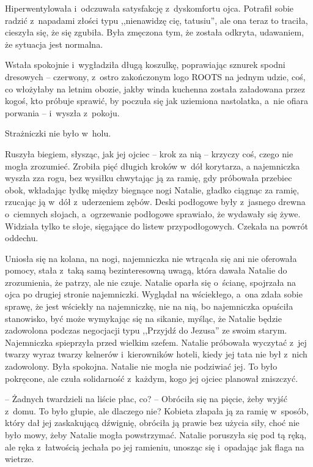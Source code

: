 \documentclass[oneside,polish,11pt,sfheadings]{mwbk}
\begin{document}
Hiperwentylowała i~odczuwała satysfakcję z~dyskomfortu ojca. Potrafił
sobie radzić z~napadami złości typu ,,nienawidzę cię, tatusiu'', ale ona
teraz to traciła, cieszyła się, że się zgubiła. Była zmęczona tym, że
została odkryta, udawaniem, że sytuacja jest normalna.

Wstała spokojnie i~wygładziła długą koszulkę, poprawiając sznurek spodni
dresowych -- czerwony, z~ostro zakończonym logo ROOTS na jednym udzie,
coś, co włożyłaby na letnim obozie, jakby winda kuchenna została
załadowana przez kogoś, kto próbuje sprawić, by poczuła się jak
uziemiona nastolatka, a~nie ofiara porwania -- i~wyszła z~pokoju.

Strażniczki nie było w~holu.

Ruszyła biegiem, słysząc, jak jej ojciec -- krok za nią -- krzyczy coś,
czego nie mogła zrozumieć. Zrobiła pięć długich kroków w~dół korytarza,
a najemniczka wyszła zza rogu, bez wysiłku chwytając ją za ramię, gdy
próbowała przebiec obok, wkładając łydkę między biegnące nogi Natalie,
gładko ciągnąc za ramię, rzucając ją w~dół z~uderzeniem zębów. Deski
podłogowe były z~jasnego drewna o~ciemnych słojach, a~ogrzewanie
podłogowe sprawiało, że wydawały się żywe. Widziała tylko te słoje,
sięgające do listew przypodłogowych. Czekała na powrót oddechu.

Uniosła się na kolana, na nogi, najemniczka nie wtrącała się ani nie
oferowała pomocy, stała z~taką samą bezinteresowną uwagą, która dawała
Natalie do zrozumienia, że patrzy, ale nie czuje. Natalie oparła się o~ścianę, spojrzała na ojca po drugiej stronie najemniczki. Wyglądał na
wściekłego, a~ona zdała sobie sprawę, że jest wściekły na najemniczkę,
nie na nią, bo najemniczka opuściła stanowisko, być może wymykając się
na sikanie, myśląc, że Natalie będzie zadowolona podczas negocjacji typu
,,Przyjdź do Jezusa'' ze swoim starym. Najemniczka spieprzyła przed
wielkim szefem. Natalie próbowała wyczytać z~jej twarzy wyraz twarzy
kelnerów i~kierowników hoteli, kiedy jej tata nie był z~nich zadowolony.
Była spokojna. Natalie nie mogła nie podziwiać jej. To było pokręcone,
ale czuła solidarność z~każdym, kogo jej ojciec planował zniszczyć.

-- Żadnych twardzieli na liście płac, co? -- Obróciła się na pięcie, żeby
wyjść z~domu. To było głupie, ale dlaczego nie? Kobieta złapała ją za
ramię w~sposób, który dał jej zaskakującą dźwignię, obróciła ją prawie
bez użycia siły, choć nie było mowy, żeby Natalie mogła powstrzymać.
Natalie poruszyła się pod tą ręką, ale ręka z~łatwością jechała po jej
ramieniu, unosząc się i~opadając jak flaga na wietrze.
\end{document}
